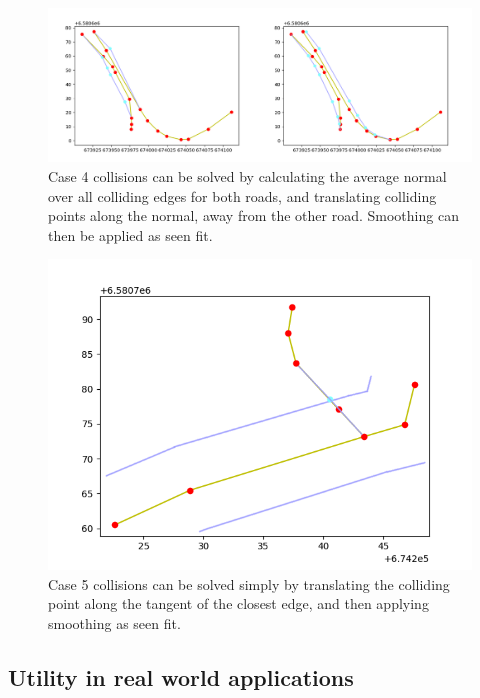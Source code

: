 \documentclass[a4paper]{article}
\begin{document}
\begin{figure}[H]
    \centering
    \includegraphics[width=\textwidth,height=0.5\textheight,keepaspectratio]{img_feature_overlap_fix_3}
    \caption{Case 4 collisions can be solved by calculating the average normal over all colliding edges for both roads, and translating colliding points along the normal, away from the other road. Smoothing can then be applied as seen fit.}
    \label{fig:collision-case-4}
\end{figure}

\begin{figure}[H]
    \centering
    \includegraphics[width=\textwidth,height=0.5\textheight,keepaspectratio]{img_feature_overlap_fix_4}
    \caption{Case 5 collisions can be solved simply by translating the colliding point along the tangent of the closest edge, and then applying smoothing as seen fit.}
    \label{fig:collision-case-5}
\end{figure}

\subsection{Utility in real world applications}
\end{document}
